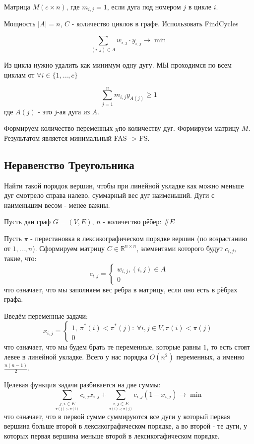 \documentclass[%
10pt, %
final, %
oneside, %
onecolumn, %
centertags]{article} %
\theoremstyle{plain}
\theoremstyle{definition}
\theoremstyle{remark}
\begin{document}
Матрица $M (c\times n)$, где $m_{i,j} = 1$, если дуга под номером $j$ в цикле $i$.

Мощность $|A| = n$, $C$ - количество циклов в графе. Использовать FindCycles

$$\sum\limits_{(i,j) \in A} w_{i,j} \cdot y_{i,j} \to \min$$

Из цикла нужно удалить как минимум одну дугу. МЫ проходимся по всем циклам от $\forall i \in \{1, \ldots, c\}$

$$\sum\limits_{j=1}^n m_{i, j}y_{A(j)} \geq 1$$
где $A(j)$ - это $j$-ая дуга из $A$. 

Формируем количество переменных $y $по количеству дуг. Формируем матрицу $M$. Результатом является минимальный FAS -> FS.

\newpage
\subsection{Неравенство Треугольника}
\label{nerav}
Найти такой порядок вершин, чтобы при линейной укладке как можно меньше дуг смотрело справа налево, суммарный вес дуг наименьший. Дуги с наименьшим весом - менее важны.

Пусть дан граф $G = (V, E)$, $n$ - количество рёбер: $\#E$

Пусть $\pi$ - перестановка в лексикографическом порядке вершин (по возрастанию от $1,\ldots, n$). Сформируем матрицу \(C \in \mathbb{R}^{n \times n}\), элементами которого будут $c_{i,j}$, такие, что:
$$c_{i,j} = \begin{cases}
	w_{i,j}, (i,j) \in A\\
	0
\end{cases}$$
что означает, что мы заполняем вес ребра в матрицу, если оно есть в рёбрах графа.

Введём переменные задачи:
$$x_{i,j} = \begin{cases}
	1,\  \pi^*(i) < \pi^*(j): \  \forall i, j \in V, \pi(i) < \pi(j)\\
	0
\end{cases}$$
что означает, что мы будем брать те переменные, которые равны $1$, то есть стоят левее в линейной укладке. Всего у нас порядка $O(n^2)$ переменных, а именно $\frac{n(n-1)}{2}$.

Целевая функция задачи разбивается на две суммы:
$$\sum\limits_{\underset{\pi(j)>\pi(i)}{j,i \in E}}c_{i,j}x_{i,j} + \sum\limits_{\underset{\pi(i)<\pi(j)}{i,j \in E}}c_{i,j}(1-x_{i,j}) \to \min$$
что означает, что в первой сумме суммируются все дуги у который первая вершина больше второй в лексикографическом порядке, а во второй - те дуги, у которых первая вершина меньше второй в лексикогафическом порядке.
\end{document}
